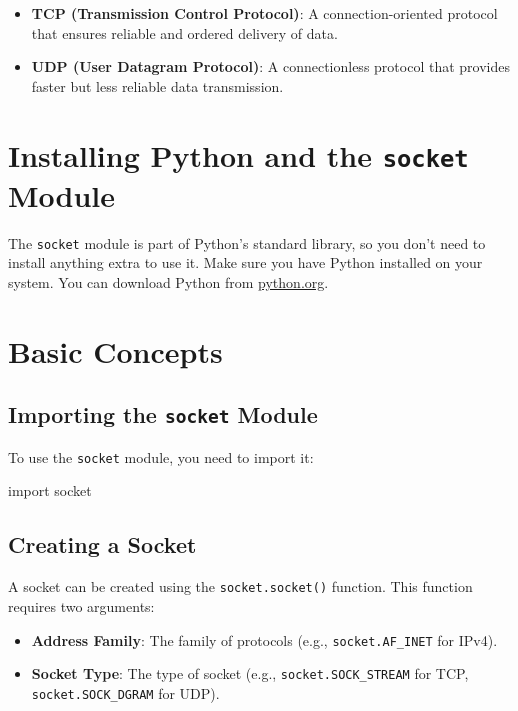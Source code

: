 \documentclass[
  letterpaper,
  DIV=11,
  numbers=noendperiod]{scrreprt}
\newenvironment{Shaded}{\begin{snugshade}}{\end{snugshade}}
\newcommand{\ImportTok}[1]{\textcolor[rgb]{0.00,0.46,0.62}{#1}}
\newcommand{\NormalTok}[1]{\textcolor[rgb]{0.00,0.23,0.31}{#1}}
\providecommand{\tightlist}{%
  \setlength{\itemsep}{0pt}\setlength{\parskip}{0pt}}\usepackage{longtable,booktabs,array}
\begin{document}
\begin{itemize}
\tightlist
\item
  \textbf{TCP (Transmission Control Protocol)}: A connection-oriented
  protocol that ensures reliable and ordered delivery of data.
\item
  \textbf{UDP (User Datagram Protocol)}: A connectionless protocol that
  provides faster but less reliable data transmission.
\end{itemize}

\section{\texorpdfstring{Installing Python and the \texttt{socket}
Module}{Installing Python and the socket Module}}\label{installing-python-and-the-socket-module}

The \texttt{socket} module is part of Python's standard library, so you
don't need to install anything extra to use it. Make sure you have
Python installed on your system. You can download Python from
\href{https://www.python.org/}{python.org}.

\section{Basic Concepts}\label{basic-concepts}

\subsection{\texorpdfstring{Importing the \texttt{socket}
Module}{Importing the socket Module}}\label{importing-the-socket-module}

To use the \texttt{socket} module, you need to import it:

\begin{Shaded}
\begin{Highlighting}[]
\ImportTok{import}\NormalTok{ socket}
\end{Highlighting}
\end{Shaded}

\subsection{Creating a Socket}\label{creating-a-socket}

A socket can be created using the \texttt{socket.socket()} function.
This function requires two arguments:

\begin{itemize}
\tightlist
\item
  \textbf{Address Family}: The family of protocols (e.g.,
  \texttt{socket.AF\_INET} for IPv4).
\item
  \textbf{Socket Type}: The type of socket (e.g.,
  \texttt{socket.SOCK\_STREAM} for TCP, \texttt{socket.SOCK\_DGRAM} for
  UDP).
\end{itemize}
\end{document}
